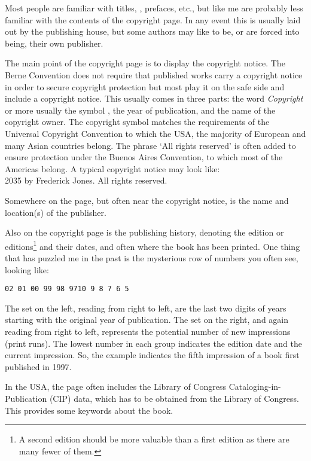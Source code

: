 \documentclass[10pt,a4paper,oneside,extrafontsizes]{memoir}%
\begin{document}
\begin{paracol}{2}
\switchEng
    Most people are familiar with titles, \toc, prefaces, etc., but like
me are probably
less familiar with the contents of the copyright page. 
In any event this is
usually laid out by the publishing house, but some authors may like to be,
or are forced into being, their own publisher.

    The main point of the copyright page is to display the 
copyright notice.
The Berne Convention does not require that published works carry a copyright
notice in order to secure copyright protection but most play it on the safe
side and include a copyright notice.
This usually comes in three parts: the word \textit{Copyright} or more usually
the symbol \textcopyright, 
the year of publication, 
and the name of the copyright owner.
The copyright symbol matches the requirements of the Universal Copyright
Convention to which the USA, the majority of European and many Asian
countries belong.
The phrase `All rights reserved' is often added to ensure protection under the
Buenos Aires Convention, to which most of the Americas belong. A typical
copyright notice may look like: \\
{\footnotesize \textcopyright{} 2035 by Frederick Jones. All rights reserved.}

    Somewhere on the page, but often near the copyright notice, is the name 
and location(s) of the publisher.

    Also on the copyright page is the publishing history, denoting the edition
or editions\footnote{A second edition should be more valuable than a first
edition as there are many fewer of them.} and their dates, 
and often where the book has been printed. One thing that has puzzled me in
the past is the mysterious row of numbers you often see, looking like: \\
\centerline{\footnotesize\texttt{02 01 00 99 98 97\hspace{2em}10 9 8 7 6 5}}
The set on the left, reading from right to left, are the last two digits
of years starting with the original year of publication.
The set on the right, and again reading from right to left, represents the
potential number of new impressions (print runs). The lowest number in each 
group indicates the edition date and the current impression. So, the example
indicates the fifth impression of a book first published in 1997.

    In the USA, the page often includes the Library of Congress 
Cataloging-in-Publication (CIP) data, 
which has to be obtained from the
Library of Congress. This provides some keywords about the book.


\end{paracol}
\end{document}
